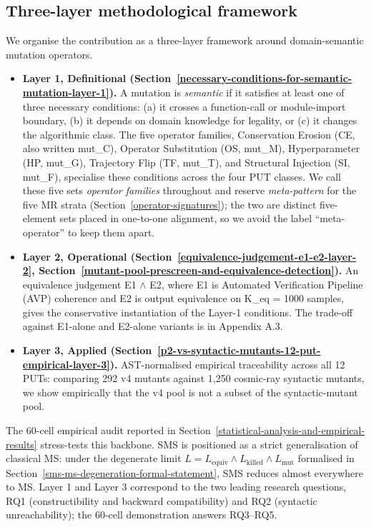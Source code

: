 \documentclass[manuscript,screen,review]{acmart}
\begin{document}
\subsection{Three-layer methodological framework}\label{three-layer-methodological-framework}

We organise the contribution as a three-layer framework around
domain-semantic mutation operators.

\begin{itemize}

\item
  \textbf{Layer 1, Definitional (Section~\ref{necessary-conditions-for-semantic-mutation-layer-1}).} A mutation is \emph{semantic}
  if it satisfies at least one of three necessary conditions: (a) it
  crosses a function-call or module-import boundary, (b) it depends on
  domain knowledge for legality, or (c) it changes the algorithmic
  class. The five operator families, Conservation Erosion (CE, also
  written mut\_C), Operator Substitution (OS, mut\_M), Hyperparameter
  (HP, mut\_G), Trajectory Flip (TF, mut\_T), and Structural Injection
  (SI, mut\_F), specialise these conditions across the four PUT classes.
  We call these five sets \emph{operator families} throughout and reserve
  \emph{meta-pattern} for the five MR strata (Section~\ref{operator-signatures});
  the two are distinct five-element sets placed in one-to-one alignment,
  so we avoid the label ``meta-operator'' to keep them apart.
\item
  \textbf{Layer 2, Operational (Section~\ref{equivalence-judgement-e1-e2-layer-2}, Section~\ref{mutant-pool-prescreen-and-equivalence-detection}).} An equivalence judgement
  E1 $\wedge$ E2, where E1 is Automated Verification Pipeline (AVP) coherence
  and E2 is output equivalence on K\_eq = 1000 samples, gives the
  conservative instantiation of the Layer-1 conditions. The trade-off
  against E1-alone and E2-alone variants is in Appendix A.3.
\item
  \textbf{Layer 3, Applied (Section~\ref{p2-vs-syntactic-mutants-12-put-empirical-layer-3}).} AST-normalised empirical
  traceability across all 12 PUTs: comparing 292 v4 mutants against
  1,250 cosmic-ray syntactic mutants, we show empirically that the v4
  pool is not a subset of the syntactic-mutant pool.
\end{itemize}

The 60-cell empirical audit reported in Section~\ref{statistical-analysis-and-empirical-results} stress-tests this
backbone. SMS is positioned as a strict generalisation of classical MS:
under the
degenerate limit $L = L_{\mathrm{equiv}} \wedge L_{\mathrm{killed}} \wedge L_{\mathrm{mut}}$
formalised in Section~\ref{sms-ms-degeneration-formal-statement}, SMS reduces almost everywhere to MS. Layer 1 and
Layer 3 correspond to the two leading research questions, RQ1
(constructibility and backward compatibility) and RQ2 (syntactic
unreachability); the 60-cell demonstration answers RQ3--RQ5.
\end{document}
